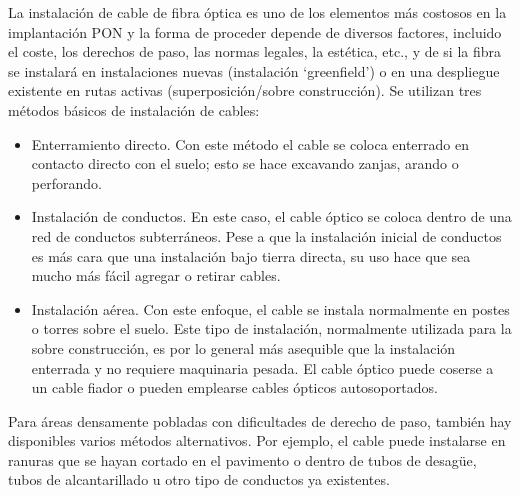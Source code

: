 La instalación de cable de fibra óptica es uno de los elementos más costosos en la implantación PON y la forma de proceder depende de diversos factores, incluido el coste, los derechos de paso, las normas legales, la estética, etc., y de si la fibra se instalará en instalaciones nuevas (instalación ‘greenfield’) o en una despliegue existente en rutas activas (superposición/sobre construcción). Se utilizan tres métodos básicos de instalación de cables:


\begin{itemize}
\item Enterramiento directo. Con este método el cable se coloca enterrado en contacto directo con el suelo; esto se hace excavando zanjas, arando o perforando.

\item Instalación de conductos. En este caso, el cable óptico se coloca dentro de una red de conductos subterráneos. Pese a que la instalación inicial de conductos es más cara que una instalación bajo tierra directa, su uso hace que sea mucho más fácil agregar o retirar cables.

\item Instalación aérea. Con este enfoque, el cable se instala normalmente en postes o torres sobre el suelo. Este tipo de instalación, normalmente utilizada para la sobre construcción, es por lo general más asequible que la instalación enterrada y no requiere maquinaria pesada. El cable óptico puede coserse a un cable fiador o pueden emplearse cables ópticos autosoportados.
\end{itemize}


Para áreas densamente pobladas con dificultades de derecho de paso, también hay disponibles varios métodos alternativos. Por ejemplo, el cable puede instalarse en ranuras que se hayan cortado en el pavimento o dentro de tubos de desagüe, tubos de alcantarillado u otro tipo de conductos ya existentes.